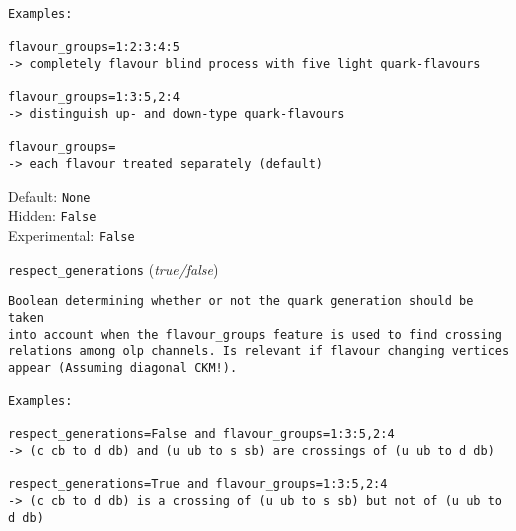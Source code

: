 \begin{basedescript}{\desclabelstyle{\pushlabel}}
\begin{verbatim}
Examples:

flavour_groups=1:2:3:4:5
-> completely flavour blind process with five light quark-flavours

flavour_groups=1:3:5,2:4
-> distinguish up- and down-type quark-flavours

flavour_groups=
-> each flavour treated separately (default)
\end{verbatim}
Default: \verb|None|
\\Hidden: \verb|False|
\\Experimental: \verb|False|
\\\item[\colorbox{gray!30}{\texttt{respect\_generations}}] (\textit{true/false})
\begin{verbatim}
Boolean determining whether or not the quark generation should be taken
into account when the flavour_groups feature is used to find crossing
relations among olp channels. Is relevant if flavour changing vertices
appear (Assuming diagonal CKM!).

Examples:

respect_generations=False and flavour_groups=1:3:5,2:4
-> (c cb to d db) and (u ub to s sb) are crossings of (u ub to d db)

respect_generations=True and flavour_groups=1:3:5,2:4
-> (c cb to d db) is a crossing of (u ub to s sb) but not of (u ub to d db)


\end{verbatim}
\end{basedescript}
